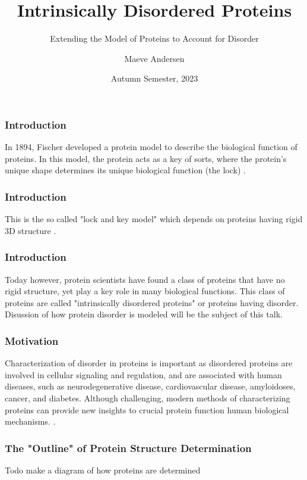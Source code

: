 \documentclass{beamer}
\title{Intrinsically Disordered Proteins}
\subtitle{Extending the Model of Proteins to Account for Disorder}
\author{Maeve Andersen}
\date{Autumn Semester, 2023}
\begin{document}
\frame{\titlepage}

\begin{frame}
\frametitle{Introduction}
In 1894, Fischer developed a protein model to describe the biological function of proteins. In this model, the protein acts as a key of sorts, where the protein's unique shape determines its unique biological function (the lock) \cite{fischerEinflussConfigurationAuf1894}.
\end{frame}
\begin{frame}
\frametitle{Introduction}
This is the so called "lock and key model" which depends on proteins having rigid 3D structure \cite{fischerEinflussConfigurationAuf1894}.
\end{frame}

\begin{frame}
\frametitle{Introduction}
Today however, protein scientists have found a class of proteins that have no rigid structure, yet play a key role in many biological functions. This class of proteins are called "intrinsically disordered proteins" or proteins having disorder. Disussion of how protein disorder is modeled will be the subject of this talk.
\end{frame}

\begin{frame}
\frametitle{Motivation}
Characterization of disorder in proteins is important as disordered proteins are involved in cellular signaling and regulation,\cite{wrightIntrinsicallyDisorderedProteins2015}
and are associated with human diseases, such as neurodegenerative disease, cardiovascular disease, amyloidoses, cancer, and diabetes.\cite{uverskyIntrinsicallyDisorderedProteins2008}
Although challenging, modern methods of characterizing proteins can provide new insights to crucial protein function human biological mechanisms. \cite{bonomiSimultaneousDeterminationProtein2018}.
\end{frame}

\begin{frame}
\frametitle{The "Outline" of Protein Structure Determination}
Todo make a diagram of how proteins are determined
\end{frame}
\end{document}
